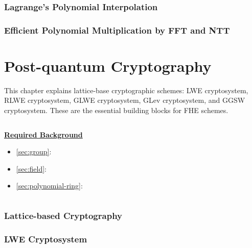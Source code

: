 \documentclass[11pt]{article}
\begin{document}
\clearpage

\section{Lagrange's Polynomial Interpolation}
\label{sec:polynomial-interpolation}


\clearpage

\section{Efficient Polynomial Multiplication by FFT and NTT}
\label{sec:ntt}


\clearpage





\part{Post-quantum Cryptography}
\label{part:pqc}

\renewcommand{\thesection}{B-\arabic{section}}
\setcounter{section}{0}

This chapter explains lattice-base cryptographic schemes: LWE cryptosystem, RLWE cryptosystem, GLWE cryptosystem, GLev cryptosystem, and GGSW cryptosystem. These are the essential building blocks for FHE schemes. 


$ $

\noindent \textbf{\underline{Required Background}}

\begin{itemize}
\item \autoref{sec:group}: 
\item \autoref{sec:field}: 
\item \autoref{sec:polynomial-ring}: 
\end{itemize}

$ $

\clearpage

\section{Lattice-based Cryptography}
\label{sec:lattice}


\clearpage

\section{LWE Cryptosystem}
\label{sec:lwe}

\end{document}
